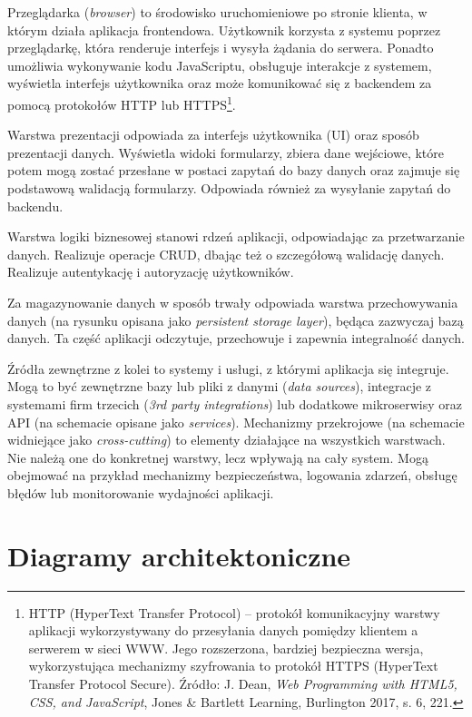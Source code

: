 \documentclass[12pt,a4paper,twoside]{report}
\begin{document}
Przeglądarka (\textit{browser}) to środowisko uruchomieniowe po stronie klienta, w którym działa aplikacja frontendowa. Użytkownik korzysta z systemu poprzez przeglądarkę, która renderuje interfejs i wysyła żądania do serwera. Ponadto umożliwia wykonywanie kodu JavaScriptu, obsługuje interakcje z systemem, wyświetla interfejs użytkownika oraz może komunikować się z backendem za pomocą protokołów HTTP lub HTTPS\footnote{HTTP (HyperText Transfer Protocol) -- protokół komunikacyjny warstwy aplikacji wykorzystywany do przesyłania danych pomiędzy klientem a serwerem w sieci WWW. Jego rozszerzona, bardziej bezpieczna wersja, wykorzystująca mechanizmy szyfrowania to protokół HTTPS (HyperText Transfer Protocol Secure). Źródło: J. Dean, \emph{Web Programming with HTML5, CSS, and JavaScript}, Jones \& Bartlett Learning, Burlington 2017, s. 6, 221.}.

Warstwa prezentacji odpowiada za interfejs użytkownika (UI) oraz sposób prezentacji danych. Wyświetla widoki formularzy, zbiera dane wejściowe, które potem mogą zostać przesłane w postaci zapytań do bazy danych oraz zajmuje się podstawową walidacją formularzy. Odpowiada również za wysyłanie zapytań do backendu.

Warstwa logiki biznesowej stanowi rdzeń aplikacji, odpowiadając za przetwarzanie danych. Realizuje operacje CRUD, dbając też o szczegółową walidację danych. Realizuje autentykację i autoryzację użytkowników.

Za magazynowanie danych w sposób trwały odpowiada warstwa przechowywania danych (na rysunku opisana jako \textit{persistent storage layer}), będąca zazwyczaj bazą danych. Ta część aplikacji odczytuje, przechowuje i zapewnia integralność danych.

Źródła zewnętrzne z kolei to systemy i usługi, z którymi aplikacja się integruje. Mogą to być zewnętrzne bazy lub pliki z danymi (\textit{data sources}), integracje z systemami firm trzecich (\textit{3rd party integrations}) lub dodatkowe mikroserwisy oraz API (na schemacie opisane jako \textit{services}). Mechanizmy przekrojowe (na schemacie widniejące jako \textit{cross-cutting}) to elementy działające na wszystkich warstwach. Nie należą one do konkretnej warstwy, lecz wpływają na cały system. Mogą obejmować na przykład mechanizmy bezpieczeństwa, logowania zdarzeń, obsługę błędów lub monitorowanie wydajności aplikacji.

\section{Diagramy architektoniczne}
\end{document}

